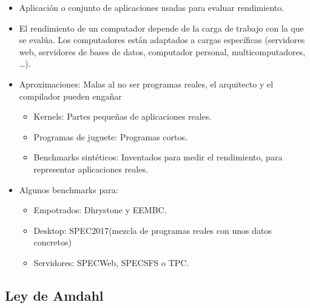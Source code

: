 \documentclass[12pt, twoside, openright]{report} %
\begin{document}
\begin{itemize}

	\item Aplicación o conjunto de aplicaciones usadas para evaluar
	      rendimiento.
	\item El rendimiento de un computador depende de la carga de trabajo con
	      la que se evalúa. Los computadores están adaptados a cargas
	      específicas (servidores web, servidores de bases de datos,
	      computador personal, multicomputadores, \ldots).
	\item Aproximaciones: Malas al no ser programas reales, el arquitecto y el
	      compilador pueden engañar

	      \begin{itemize}

		      \item Kernels: Partes pequeñas de aplicaciones reales.
		      \item Programas de juguete: Programas cortos.
		      \item Benchmarks sintéticos: Inventados para medir el rendimiento, para
		            representar aplicaciones reales.
	      \end{itemize}
	\item Algunos benchmarks para:

	      \begin{itemize}

		      \item Empotrados: Dhrystone y EEMBC.
		      \item Desktop: SPEC2017(mezcla de programas reales con unos datos
		            concretos)
		      \item Servidores: SPECWeb, SPECSFS o TPC.
	      \end{itemize}
\end{itemize}

\subsection{Ley de Amdahl}
\end{document}

